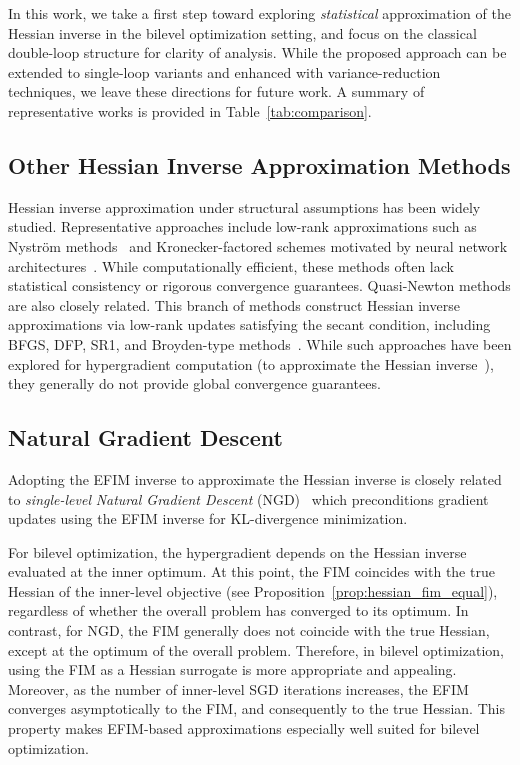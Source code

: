 \documentclass[11 pt]{article}
\begin{document}
In this work, we take a first step toward exploring \emph{statistical} approximation of the Hessian inverse in the bilevel optimization setting, and focus on the classical double-loop structure for clarity of analysis. While the proposed approach can be extended to single-loop variants and enhanced with variance-reduction techniques, we leave these directions for future work. A summary of representative works is provided in Table~\ref{tab:comparison}.


\subsection{Other Hessian Inverse Approximation Methods}
Hessian inverse approximation under structural assumptions has been widely studied. Representative approaches include low-rank approximations such as Nyström methods~\cite{hataya2023nystrom} and Kronecker-factored schemes motivated by neural network architectures~\cite{martens2015optimizing}. While computationally efficient, these methods often lack statistical consistency or rigorous convergence guarantees. Quasi-Newton methods are also closely related. This branch of methods construct Hessian inverse approximations via low-rank updates satisfying the secant condition, including BFGS, DFP, SR1, and Broyden-type methods~\cite{nocedal2006numerical}. While such approaches have been explored for hypergradient computation (to approximate the Hessian inverse~\cite{hao2023bi}), they generally do not provide global convergence guarantees.

\subsection{Natural Gradient Descent}
Adopting the EFIM inverse to approximate the Hessian inverse is closely related to \emph{single-level} \emph{Natural Gradient Descent} (NGD)~\cite{amari1998natural, martens2020new} which preconditions gradient updates using the EFIM inverse for KL-divergence minimization. 


For bilevel optimization, the hypergradient depends on the Hessian inverse evaluated at the inner optimum. At this point, the FIM coincides with the true Hessian of the inner-level objective (see Proposition~\ref{prop:hessian_fim_equal}), regardless of whether the overall problem has converged to its optimum. In contrast, for NGD, the FIM generally does not coincide with the true Hessian, except at the optimum of the overall problem. Therefore, in bilevel optimization, using the FIM as a Hessian surrogate is more appropriate and appealing. Moreover, as the number of inner-level SGD iterations increases, the EFIM converges asymptotically to the FIM, and consequently to the true Hessian. This property makes EFIM-based approximations especially well suited for bilevel optimization.
\end{document}
